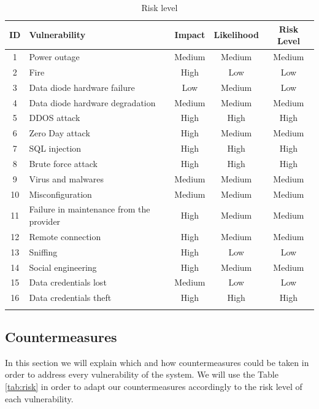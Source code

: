 \documentclass[a4paper,10pt]{article}
\begin{document}
\begin{longtable}{|c|p{4cm}|c|c|c|}
	\hline
	\textbf{ID}& \textbf{Vulnerability}  & \textbf{Impact} & \textbf{Likelihood} & \textbf{Risk Level}          \\
	\hline
	1 & Power outage & \color{yellow}Medium & Medium & \cellcolor{yellow}Medium \\
	\hline
	2 & Fire  & High & Low & \cellcolor{green}Low \\
	\hline
	3 & Data diode hardware failure & \color{green}Low & Medium & \cellcolor{green}Low \\
	\hline
	4 & Data diode hardware degradation & Medium & Medium &\cellcolor{yellow}Medium  \\
	\hline
	5 & DDOS attack & High & \color{red}High & \cellcolor{red}High \\
	\hline
	6 & Zero Day attack & High & Medium & \cellcolor{yellow}Medium \\
	\hline
	7 &  SQL injection & High & High & \cellcolor{red}High \\
	\hline
	8 & Brute force attack & High & High &\cellcolor{red} High\\
	\hline
	9 & Virus and malwares & Medium & Medium & \cellcolor{yellow}Medium \\
	\hline
	10 & Misconfiguration & Medium & Medium & \cellcolor{yellow}Medium \\
	\hline
	11 & Failure in maintenance from the provider & High & Medium & \cellcolor{yellow}Medium\\
	\hline
	12 & Remote connection & High & Medium & \cellcolor{yellow}Medium\\
	\hline
	13 & Sniffing & High & Low & \cellcolor{green}Low \\
	\hline
	14 & Social engineering & High & Medium & \cellcolor{yellow}Medium \\
	\hline
	15 & Data credentials lost & Medium & Low & \cellcolor{green}Low \\
	\hline
	16 & Data credentials theft & High & High & \cellcolor{red}High \\
	\hline
	\caption{Risk level}
	\label{tab:risklvl}
\end{longtable}



\subsection{Countermeasures}
In this section we will explain which and how countermeasures could be taken in order to address every vulnerability of the system. We will use the Table \ref{tab:risk} in order to adapt our countermeasures accordingly to the risk level of each vulnerability.
\end{document}
